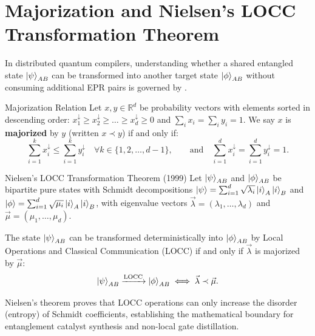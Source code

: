 \section{Majorization and Nielsen's LOCC Transformation Theorem}
\label{sec:app_nielsen_locc}

In distributed quantum compilers, understanding whether a shared entangled state $\ket{\psi}_{AB}$ can be transformed into another target state $\ket{\phi}_{AB}$ without consuming additional EPR pairs is governed by .

\begin{definitionbox}{Majorization Relation}
Let $x, y \in \mathbb{R}^d$ be probability vectors with elements sorted in descending order: $x_1^\downarrow \ge x_2^\downarrow \ge \dots \ge x_d^\downarrow \ge 0$ and $\sum_i x_i = \sum_i y_i = 1$. We say $x$ is \textbf{majorized} by $y$ (written $x \prec y$) if and only if:
\begin{equation}
    \sum_{i=1}^k x_i^\downarrow \le \sum_{i=1}^k y_i^\downarrow \quad \forall k \in \{1, 2, \dots, d-1\}, \qquad \text{and} \quad \sum_{i=1}^d x_i^\downarrow = \sum_{i=1}^d y_i^\downarrow = 1.
\end{equation}
\end{definitionbox}

\begin{theorembox}{Nielsen's LOCC Transformation Theorem (1999)}
Let $\ket{\psi}_{AB}$ and $\ket{\phi}_{AB}$ be bipartite pure states with Schmidt decompositions $\ket{\psi} = \sum_{i=1}^d \sqrt{\lambda_i} \ket{i}_A \ket{i}_B$ and $\ket{\phi} = \sum_{i=1}^d \sqrt{\mu_i} \ket{i}_A \ket{i}_B$, with eigenvalue vectors $\vec{\lambda} = (\lambda_1, \dots, \lambda_d)$ and $\vec{\mu} = (\mu_1, \dots, \mu_d)$.

The state $\ket{\psi}_{AB}$ can be transformed deterministically into $\ket{\phi}_{AB}$ by Local Operations and Classical Communication (LOCC) if and only if $\vec{\lambda}$ is majorized by $\vec{\mu}$:
\begin{equation}
    \ket{\psi}_{AB} \xrightarrow{\text{LOCC}} \ket{\phi}_{AB} \iff \vec{\lambda} \prec \vec{\mu}.
\end{equation}
\end{theorembox}

Nielsen's theorem proves that LOCC operations can only increase the disorder (entropy) of Schmidt coefficients, establishing the mathematical boundary for entanglement catalyst synthesis and non-local gate distillation.

